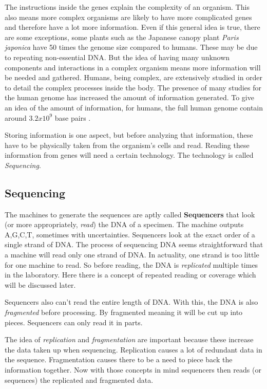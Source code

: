 \documentclass[acmsmall]{acmart}
\begin{document}
The instructions inside the genes explain the complexity of an organism. This also means more complex organisms are likely to have more complicated genes and therefore have a lot more information. Even if this general idea is true, there are some exceptions, some plants such as the Japanese canopy plant \textit{Paris japonica} have 50 times the genome size compared to humans\cite{campbell}. These may be due to repeating non-essential DNA. But the idea of having many unknown components and interactions in a complex organism means more information will be needed and gathered. Humans, being complex, are extensively studied in order to detail the complex processes inside the body. The presence of many studies for the human genome has increased the amount of information generated. To give an idea of the amount of information, for humans, the full human genome contain around $3.2x10^9$ base pairs \cite{introgenomics}. 

Storing information is one aspect, but before analyzing that information, these have to be physically taken from the organism's cells and read. Reading these information from genes will need a certain technology. The technology is called \textit{Sequencing}.

\subsection{Sequencing}

The machines to generate the sequences are aptly called \textbf{Sequencers} that look (or more appropriately, \textit{read}) the DNA of a specimen. The machine outputs A,G,C,T, sometimes with uncertainties. Sequencers look at the exact order of a single strand of DNA. The process of sequencing DNA seems straightforward that a machine will read only one strand of DNA. In actuality, one strand is too little for one machine to read. So before reading, the DNA is \textit{replicated} multiple times in the laboratory. Here there is a concept of repeated reading or coverage which will be discussed later.

Sequencers also can't read the entire length of DNA. With this, the DNA is also \textit{fragmented} before processing. By fragmented meaning it will be cut up into pieces. Sequencers can only read it in parts. 

The idea of \textit{replication} and \textit{fragmentation} are important because these increase the data taken up when sequencing. Replication causes a lot of redundant data in the sequence. Fragmentation causes there to be a need to piece back the information together. Now with those concepts in mind sequencers then reads (or sequences) the replicated and fragmented data.
\end{document}

